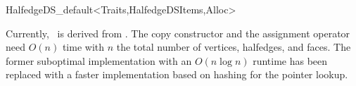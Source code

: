 \begin{ccRefClass}{HalfedgeDS_default<Traits,HalfedgeDSItems,Alloc>}
\ccImplementation

Currently, \ccRefName\ is derived from .
The copy constructor and the assignment operator need $O(n)$ time with
$n$ the total number of vertices, halfedges, and faces. The former 
suboptimal implementation with an $O(n \log n)$ runtime has been replaced
with a faster implementation based on hashing for the pointer lookup.

\end{ccRefClass}

\ccRefPageEnd

